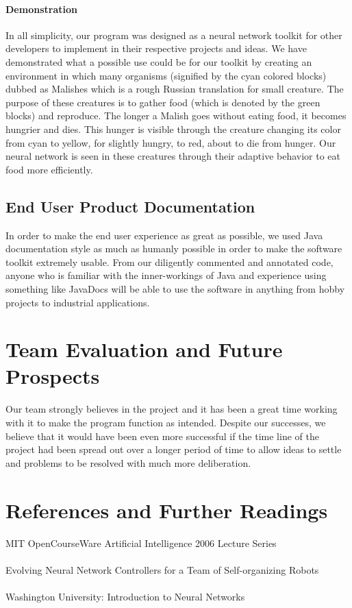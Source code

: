 \documentclass[letterpaper, 10pt]{article}
\begin{document}
		\paragraph{Demonstration} In all simplicity, our program was designed as a neural network toolkit for other developers to implement in their respective projects and ideas. We have demonstrated what a possible use could be for our toolkit by creating an environment in which many organisms (signified by the cyan colored blocks) dubbed as Malishes which is a rough Russian translation for small creature. The purpose of these creatures is to gather food (which is denoted by the green blocks) and reproduce. The longer a Malish goes without eating food, it becomes hungrier and dies. This hunger is visible through the creature changing its color from cyan to yellow, for slightly hungry, to red, about to die from hunger. Our neural network is seen in these creatures through their adaptive behavior to eat food more efficiently.  
	\subsection{End User Product Documentation}
		In order to make the end user experience as great as possible, we used Java documentation style as much as humanly possible in order to make the software toolkit extremely usable. From our diligently commented and annotated code, anyone who is familiar with the inner-workings of Java and experience using something like JavaDocs will be able to use the software in anything from hobby projects to industrial applications.
\section{Team Evaluation and Future Prospects}
	Our team strongly believes in the project and it has been a great time working with it to make the program function as intended. Despite our successes, we believe that it would have been even more successful if the time line of the project had been spread out over a longer period of time to allow ideas to settle and problems to be resolved with much more deliberation.
\cleardoublepage
\section{References and Further Readings}
	MIT OpenCourseWare Artificial Intelligence 2006 Lecture Series \\ \\
	Evolving Neural Network Controllers for a Team of
	Self-organizing Robots\\\\
	Washington University: Introduction to Neural Networks
\end{document}
